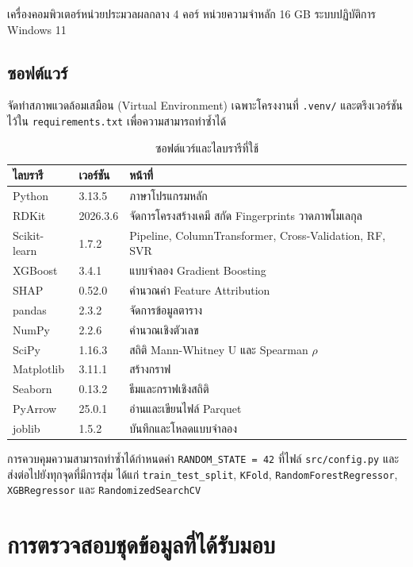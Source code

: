 เครื่องคอมพิวเตอร์หน่วยประมวลผลกลาง 4 คอร์ หน่วยความจำหลัก 16 GB ระบบปฏิบัติการ Windows 11

\subsection{ซอฟต์แวร์}

จัดทำสภาพแวดล้อมเสมือน (Virtual Environment) เฉพาะโครงงานที่ \texttt{.venv/} และตรึงเวอร์ชันไว้ใน \texttt{requirements.txt} เพื่อความสามารถทำซ้ำได้

\begin{table}[H]
\centering
\caption{ซอฟต์แวร์และไลบรารีที่ใช้}
\label{tab:software}
\begin{tabular}{L{3.4cm} C{2.4cm} L{7.6cm}}
\toprule
\textbf{ไลบรารี} & \textbf{เวอร์ชัน} & \textbf{หน้าที่}\\
\midrule
Python & 3.13.5 & ภาษาโปรแกรมหลัก\\
RDKit & 2026.3.6 & จัดการโครงสร้างเคมี สกัด Fingerprints วาดภาพโมเลกุล\\
Scikit-learn & 1.7.2 & Pipeline, ColumnTransformer, Cross-Validation, RF, SVR\\
XGBoost & 3.4.1 & แบบจำลอง Gradient Boosting\\
SHAP & 0.52.0 & คำนวณค่า Feature Attribution\\
pandas & 2.3.2 & จัดการข้อมูลตาราง\\
NumPy & 2.2.6 & คำนวณเชิงตัวเลข\\
SciPy & 1.16.3 & สถิติ Mann-Whitney U และ Spearman $\rho$\\
Matplotlib & 3.11.1 & สร้างกราฟ\\
Seaborn & 0.13.2 & ธีมและกราฟเชิงสถิติ\\
PyArrow & 25.0.1 & อ่านและเขียนไฟล์ Parquet\\
joblib & 1.5.2 & บันทึกและโหลดแบบจำลอง\\
\bottomrule
\end{tabular}
\end{table}

การควบคุมความสามารถทำซ้ำได้กำหนดค่า \texttt{RANDOM\_STATE = 42} ที่ไฟล์ \texttt{src/config.py} และส่งต่อไปยังทุกจุดที่มีการสุ่ม ได้แก่ \texttt{train\_test\_split}, \texttt{KFold}, \texttt{RandomForestRegressor}, \texttt{XGBRegressor} และ \texttt{RandomizedSearchCV}

\section{การตรวจสอบชุดข้อมูลที่ได้รับมอบ}

